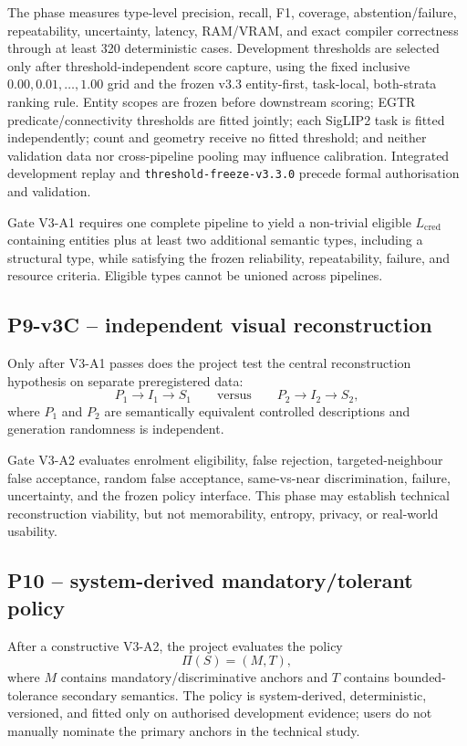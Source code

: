 \documentclass[11pt,a4paper]{article}
\newcommand{\code}[1]{\texttt{#1}}
\begin{document}
The phase measures type-level precision, recall, F1, coverage, abstention/failure, repeatability, uncertainty, latency, RAM/VRAM, and exact compiler correctness through at least 320 deterministic cases. Development thresholds are selected only after threshold-independent score capture, using the fixed inclusive $0.00,0.01,\ldots,1.00$ grid and the frozen v3.3 entity-first, task-local, both-strata ranking rule. Entity scopes are frozen before downstream scoring; EGTR predicate/connectivity thresholds are fitted jointly; each SigLIP2 task is fitted independently; count and geometry receive no fitted threshold; and neither validation data nor cross-pipeline pooling may influence calibration. Integrated development replay and \code{threshold-freeze-v3.3.0} precede formal authorisation and validation.

Gate V3-A1 requires one complete pipeline to yield a non-trivial eligible $L_{\mathrm{cred}}$ containing entities plus at least two additional semantic types, including a structural type, while satisfying the frozen reliability, repeatability, failure, and resource criteria. Eligible types cannot be unioned across pipelines.

\subsection{P9-v3C -- independent visual reconstruction}

Only after V3-A1 passes does the project test the central reconstruction hypothesis on separate preregistered data:
\begin{equation}
  P_1\rightarrow I_1\rightarrow S_1
  \qquad \text{versus} \qquad
  P_2\rightarrow I_2\rightarrow S_2,
\end{equation}
where $P_1$ and $P_2$ are semantically equivalent controlled descriptions and generation randomness is independent.

Gate V3-A2 evaluates enrolment eligibility, false rejection, targeted-neighbour false acceptance, random false acceptance, same-vs-near discrimination, failure, uncertainty, and the frozen policy interface. This phase may establish technical reconstruction viability, but not memorability, entropy, privacy, or real-world usability.

\subsection{P10 -- system-derived mandatory/tolerant policy}

After a constructive V3-A2, the project evaluates the policy
\begin{equation}
  \Pi(S)=(M,T),
\end{equation}
where $M$ contains mandatory/discriminative anchors and $T$ contains bounded-tolerance secondary semantics. The policy is system-derived, deterministic, versioned, and fitted only on authorised development evidence; users do not manually nominate the primary anchors in the technical study.
\end{document}
